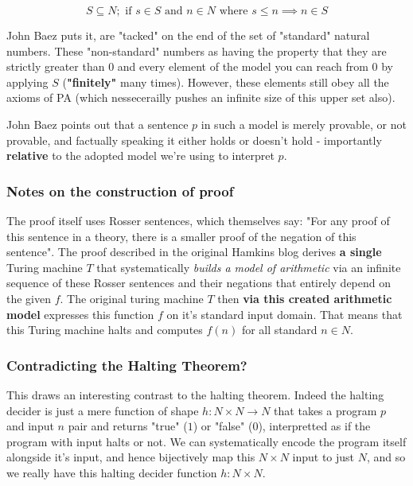 \documentclass{article}
\begin{document}
\begin{equation}
	S \subseteq N; \text{ if } s \in S \text { and } n \in N \text{ where } s \leq n \implies n \in S
\end{equation}

John Baez puts it, are "tacked" on the end of the set of "standard" natural numbers. These "non-standard" numbers as having the property that they are strictly greater than $0$ and every element of the model you can reach from 0 by applying $S$ (\textbf{"finitely"} many times). However, these elements still obey all the axioms of PA (which nessecerailly pushes an infinite size of this upper set also).

John Baez points out that a sentence $p$ in such a model is merely provable, or not provable, and factually speaking it either holds or doesn't hold - importantly \textbf{relative} to the adopted model we're using to interpret $p$.

\subsubsection{Notes on the construction of proof}
The proof itself uses Rosser sentences, which themselves say: "For any proof of this sentence in a theory, there is a smaller proof of the negation of this sentence". The proof described in the original Hamkins blog derives \textbf{a single} Turing machine $T$ that systematically \emph{builds a model of arithmetic} via an infinite sequence of these Rosser sentences and their negations that entirely depend on the given $f$. The original turing machine $T$ then \textbf{via this created arithmetic model} expresses this function $f$ on it's standard input domain. That means that this Turing machine halts and computes $f(n)$ for all standard $n \in N$.

\subsubsection{Contradicting the Halting Theorem?}
This draws an interesting contrast to the halting theorem. Indeed the halting decider is just a mere function of shape $h: N \times N \rightarrow N$ that takes a program $p$ and input $n$ pair and returns "true" ($1$) or "false" ($0$), interpretted as if the program with input halts or not. We can systematically encode the program itself alongside it's input, and hence bijectively map this $N \times N$ input to just $N$, and so we really have this halting decider function $h: N \times N$.
\end{document}
